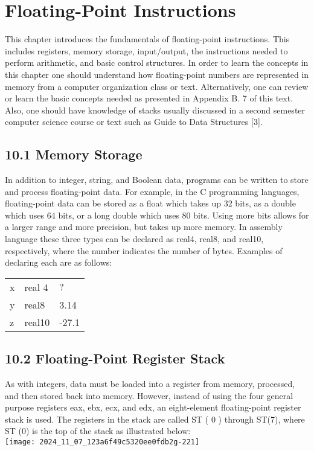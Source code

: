 \documentclass[10pt]{article}
\begin{document}
\section*{Floating-Point Instructions}
This chapter introduces the fundamentals of floating-point instructions. This includes registers, memory storage, input/output, the instructions needed to perform arithmetic, and basic control structures. In order to learn the concepts in this chapter one should understand how floating-point numbers are represented in memory from a computer organization class or text. Alternatively, one can review or learn the basic concepts needed as presented in Appendix B. 7 of this text. Also, one should have knowledge of stacks usually discussed in a second semester computer science course or text such as Guide to Data Structures [3].

\subsection*{10.1 Memory Storage}
In addition to integer, string, and Boolean data, programs can be written to store and process floating-point data. For example, in the C programming languages, floating-point data can be stored as a float which takes up 32 bits, as a double which uses 64 bits, or a long double which uses 80 bits. Using more bits allows for a larger range and more precision, but takes up more memory. In assembly language these three types can be declared as real4, real8, and real10, respectively, where the number indicates the number of bytes. Examples of declaring each are as follows:

\begin{center}
\begin{tabular}{lll}
x & real 4 & $?$ \\
y & real8 & 3.14 \\
z & real10 & -27.1 \\
\end{tabular}
\end{center}

\subsection*{10.2 Floating-Point Register Stack}
As with integers, data must be loaded into a register from memory, processed, and then stored back into memory. However, instead of using the four general purpose registers eax, ebx, ecx, and edx, an eight-element floating-point register stack is used. The registers in the stack are called ST ( 0 ) through ST(7), where ST (0) is the top of the stack as illustrated below:\\
\texttt{[image: 2024\_11\_07\_123a6f49c5320ee0fdb2g-221]}
\end{document}
